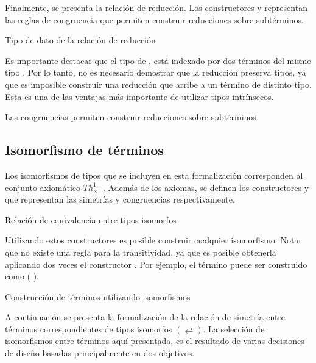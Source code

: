 Finalmente, se presenta la relación de reducción.
Los constructores \const{$\xi$} y \const{$\zeta$} representan las reglas de congruencia que permiten construir reducciones sobre subtérminos.

\begin{codigo}
	Tipo de dato de la relación de reducción
	
\end{codigo}

Es importante destacar que el tipo de \type{$\_\hookrightarrow\_$}, está indexado por dos términos del mismo tipo .
Por lo tanto, no es necesario demostrar que la reducción preserva tipos, ya que es imposible construir una reducción que arribe a un término de distinto tipo.
Esta es una de las ventajas más importante de utilizar tipos intrínsecos.

\begin{example}
	Las congruencias permiten construir reducciones sobre subtérminos
\end{example}

\subsection{Isomorfismo de términos}

Los isomorfismos de tipos que se incluyen en esta formalización corresponden al conjunto axiomático $Th^1_{\times\top}$.
Además de los axiomas, se definen los constructores  y  que representan las simetrías y congruencias respectivamente.

\begin{codigo}
	Relación de equivalencia entre tipos isomorfos
	
\end{codigo}
Utilizando estos constructores es posible construir cualquier isomorfismo.
Notar que no existe una regla para la transitividad, ya que es posible obtenerla aplicando dos veces el constructor \const{$[\_]\equiv\_$}.
Por ejemplo, el término \const{[ trans}   \const{]$\equiv$}  puede ser construido como \const{[}  \const{]$\equiv$} (\const{[}  \const{]$\equiv$} ).

\begin{example}
	Construcción de términos utilizando isomorfismos
\end{example}

A continuación se presenta la formalización de la relación de simetría entre términos correspondientes de tipos isomorfos $(\rightleftarrows)$.
La selección de isomorfismos entre términos aquí presentada, es el resultado de varias decisiones de diseño basadas principalmente en dos objetivos.

